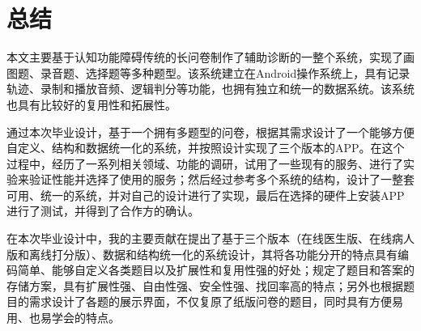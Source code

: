 

\chapter{总结}

本文主要基于认知功能障碍传统的长问卷制作了辅助诊断的一整个系统，实现了画图题、录音题、选择题等多种题型。该系统建立在Android操作系统上，具有记录轨迹、录制和播放音频、逻辑判分等功能，也拥有独立和统一的数据系统。该系统也具有比较好的复用性和拓展性。

通过本次毕业设计，基于一个拥有多题型的问卷，根据其需求设计了一个能够方便自定义、结构和数据统一化的系统，并按照设计实现了三个版本的APP。在这个过程中，经历了一系列相关领域、功能的调研，试用了一些现有的服务、进行了实验来验证性能并选择了使用的服务；然后经过参考多个系统的结构，设计了一整套可用、统一的系统，并对自己的设计进行了实现，最后在选择的硬件上安装APP进行了测试，并得到了合作方的确认。

在本次毕业设计中，我的主要贡献在提出了基于三个版本（在线医生版、在线病人版和离线打分版）、数据和结构统一化的系统设计，其将各功能分开的特点具有编码简单、能够自定义各类题目以及扩展性和复用性强的好处；规定了题目和答案的存储方案，具有扩展性强、自由性强、安全性强、找回率高的特点；另外也根据题目的需求设计了各题的展示界面，不仅复原了纸版问卷的题目，同时具有方便易用、也易学会的特点。